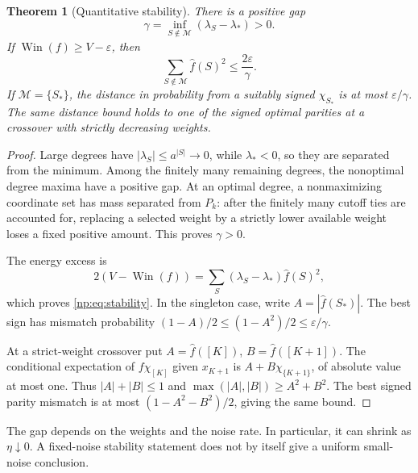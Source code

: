 \documentclass[11pt,a4paper]{article}
\newtheorem{theorem}{Theorem}[section]
\theoremstyle{definition}
\theoremstyle{remark}
\newcommand{\Win}{\operatorname{Win}}
\begin{document}
\begin{theorem}[Quantitative stability]\label{np:thm:stability}
There is a positive gap
\[
 \gamma=\inf_{S\notin\mathcal M}(\lambda_S-\lambda_*)>0.
\]
If \(\Win(f)\ge V-\varepsilon\), then
\begin{equation}\label{np:eq:stability}
 \sum_{S\notin\mathcal M}\widehat f(S)^2
 \le\frac{2\varepsilon}{\gamma}.
\end{equation}
If \(\mathcal M=\{S_*\}\), the distance in probability from a suitably
signed \(\chi_{S_*}\) is at most \(\varepsilon/\gamma\).
The same distance bound holds to one of the signed optimal parities at
a crossover with strictly decreasing weights.
\end{theorem}
\begin{proof}
Large degrees have \(|\lambda_S|\le a^{|S|}\to0\), while
\(\lambda_*<0\), so they are separated from the minimum.
Among the finitely many remaining degrees, the nonoptimal degree
maxima have a positive gap. At an optimal degree, a nonmaximizing
coordinate set has mass separated from \(P_k\): after the finitely
many cutoff ties are accounted for, replacing a selected weight by
a strictly lower available weight loses a fixed positive amount.
This proves \(\gamma>0\).

The energy excess is
\[
 2(V-\Win(f))
 =\sum_S(\lambda_S-\lambda_*)\widehat f(S)^2,
\]
which proves \eqref{np:eq:stability}. In the singleton case, write
\(A=|\widehat f(S_*)|\). The best sign has mismatch probability
\((1-A)/2\le(1-A^2)/2\le\varepsilon/\gamma\).

At a strict-weight crossover put
\(A=\widehat f([K])\), \(B=\widehat f([K+1])\).
The conditional expectation of \(f\chi_{[K]}\) given \(x_{K+1}\) is
\(A+B\chi_{\{K+1\}}\), of absolute value at most one. Thus
\(|A|+|B|\le1\) and
\(\max(|A|,|B|)\ge A^2+B^2\).
The best signed parity mismatch is at most
\((1-A^2-B^2)/2\), giving the same bound.
\end{proof}

The gap depends on the weights and the noise rate. In particular, it can
shrink as \(\eta\downarrow0\). A fixed-noise stability statement does
not by itself give a uniform small-noise conclusion.
\end{document}
